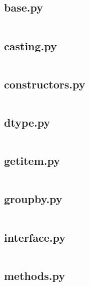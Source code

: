 \documentclass{article}
\begin{document}
\subsection{base.py}
\inputminted{python}{/home/dufferzafar/dev/@clones/pandas/pandas/tests/extension/base/base.py}
\newpage

\subsection{casting.py}
\inputminted{python}{/home/dufferzafar/dev/@clones/pandas/pandas/tests/extension/base/casting.py}
\newpage

\subsection{constructors.py}
\inputminted{python}{/home/dufferzafar/dev/@clones/pandas/pandas/tests/extension/base/constructors.py}
\newpage

\subsection{dtype.py}
\inputminted{python}{/home/dufferzafar/dev/@clones/pandas/pandas/tests/extension/base/dtype.py}
\newpage

\subsection{getitem.py}
\inputminted{python}{/home/dufferzafar/dev/@clones/pandas/pandas/tests/extension/base/getitem.py}
\newpage

\subsection{groupby.py}
\inputminted{python}{/home/dufferzafar/dev/@clones/pandas/pandas/tests/extension/base/groupby.py}
\newpage

\subsection{interface.py}
\inputminted{python}{/home/dufferzafar/dev/@clones/pandas/pandas/tests/extension/base/interface.py}
\newpage

\subsection{methods.py}
\inputminted{python}{/home/dufferzafar/dev/@clones/pandas/pandas/tests/extension/base/methods.py}
\newpage
\end{document}
